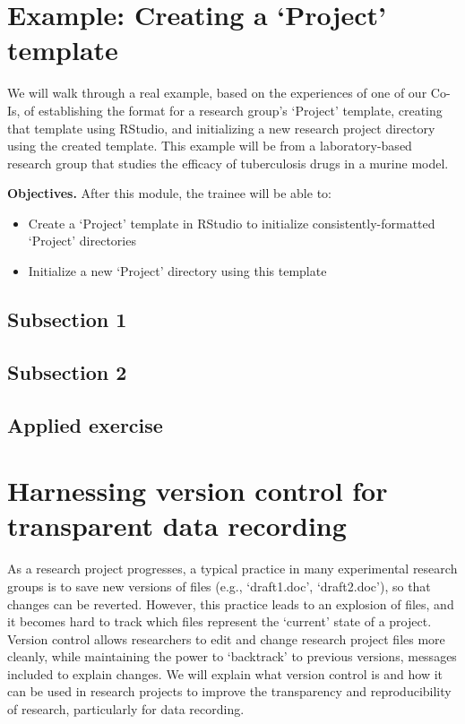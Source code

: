 \documentclass[]{tufte-book}
\providecommand{\tightlist}{%
  \setlength{\itemsep}{0pt}\setlength{\parskip}{0pt}}
\begin{document}
\hypertarget{example-creating-a-project-template}{%
\section{Example: Creating a `Project' template}\label{example-creating-a-project-template}}

We will walk through a real example, based on the experiences of one of our
Co-Is, of establishing the format for a research group's `Project' template,
creating that template using RStudio, and initializing a new research project
directory using the created template. This example will be from a
laboratory-based research group that studies the efficacy of tuberculosis drugs
in a murine model.

\textbf{Objectives.} After this module, the trainee will be able to:

\begin{itemize}
\tightlist
\item
  Create a `Project' template in RStudio to initialize consistently-formatted
  `Project' directories
\item
  Initialize a new `Project' directory using this template
\end{itemize}

\hypertarget{subsection-1-4}{%
\subsection{Subsection 1}\label{subsection-1-4}}

\hypertarget{subsection-2-3}{%
\subsection{Subsection 2}\label{subsection-2-3}}

\hypertarget{applied-exercise-2}{%
\subsection{Applied exercise}\label{applied-exercise-2}}

\hypertarget{harnessing-version-control-for-transparent-data-recording}{%
\section{Harnessing version control for transparent data recording}\label{harnessing-version-control-for-transparent-data-recording}}

As a research project progresses, a typical practice in many experimental
research groups is to save new versions of files (e.g., `draft1.doc',
`draft2.doc'), so that changes can be reverted. However, this practice leads to
an explosion of files, and it becomes hard to track which files represent the
`current' state of a project. Version control allows researchers to edit and
change research project files more cleanly, while maintaining the power to
`backtrack' to previous versions, messages included to explain changes. We will
explain what version control is and how it can be used in research projects to
improve the transparency and reproducibility of research, particularly for data
recording.
\end{document}
